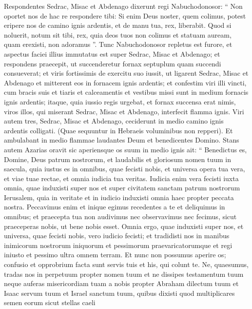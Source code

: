 \begin{biblechapter}
\begin{biblechapter}
\begin{biblechapter}
 \verse Respondentes Sedrac, Misac et Abdenago dixerunt regi Nabuchodonosor: “ Non oportet nos de hac re respondere tibi: 
\verse Si enim Deus noster, quem colimus, potest eripere nos de camino ignis ardentis, et de manu tua, rex, liberabit. 
 \verse Quod si noluerit, notum sit tibi, rex, quia deos tuos non colimus et statuam auream, quam erexisti, non adoramus ”.
 \verse Tunc Nabuchodonosor repletus est furore, et aspectus faciei illius immutatus est super Sedrac, Misac et Abdenago; et respondens praecepit, ut succenderetur fornax septuplum quam succendi consueverat; 
\verse et viris fortissimis de exercitu suo iussit, ut ligarent Sedrac, Misac et Abdenago et mitterent eos in fornacem ignis ardentis; 
\verse et confestim viri illi vincti, cum bracis suis et tiaris et calceamentis et vestibus missi sunt in medium fornacis ignis ardentis; 
\verse itaque, quia iussio regis urgebat, et fornax succensa erat nimis, viros illos, qui miserant Sedrac, Misac et Abdenago, interfecit flamma ignis. 
\verse Viri autem tres, Sedrac, Misac et Abdenago, ceciderunt in medio camino ignis ardentis colligati.
 (Quae sequuntur in Hebraeis voluminibus non repperi).
 \verse Et ambulabant in medio flammae laudantes Deum et benedicentes Domino. 
\verse Stans autem Azarias oravit sic aperiensque os suum in medio ignis ait:
 \verse “ Benedictus es, Domine, Deus patrum nostrorum,
 et laudabilis et gloriosum nomen tuum in saecula,
 \verse quia iustus es in omnibus, quae fecisti nobis,
 et universa opera tua vera, et viae tuae rectae,
 et omnia iudicia tua veritas.
 \verse Iudicia enim vera fecisti
 iuxta omnia, quae induxisti super nos
 et super civitatem sanctam patrum nostrorum Ierusalem,
 quia in veritate et in iudicio induxisti omnia haec
 propter peccata nostra.
 \verse Peccavimus enim et inique egimus recedentes a te
 et deliquimus in omnibus;
 \verse et praecepta tua non audivimus
 nec observavimus
 nec fecimus, sicut praeceperas nobis,
 ut bene nobis esset.
 \verse Omnia ergo, quae induxisti super nos,
 et universa, quae fecisti nobis,
 vero iudicio fecisti;
 \verse et tradidisti nos in manibus inimicorum nostrorum
 iniquorum et pessimorum praevaricatorumque
 et regi iniusto et pessimo ultra omnem terram.
 \verse Et nunc non possumus aperire os;
 confusio et opprobrium facta sunt
 servis tuis et his, qui colunt te.
 \verse Ne, quaesumus, tradas nos in perpetuum
 propter nomen tuum
 et ne dissipes testamentum tuum
 \verse neque auferas misericordiam tuam a nobis
 propter Abraham dilectum tuum
 et Isaac servum tuum
 et Israel sanctum tuum,
 \verse quibus dixisti
 quod multiplicares semen eorum sicut stellas caeli

\end{biblechapter}
\end{biblechapter}
\end{biblechapter}
